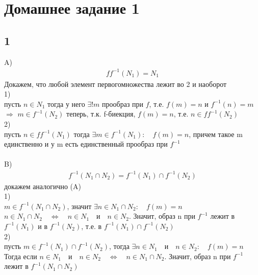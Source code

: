 \newpage
	\section{Домашнее задание 1}
		\subsection{1}
		A)\\
		\begin{gather*}
			ff^{-1}(N_1) = N_1
		\end{gather*}
		Докажем, что любой элемент первогомножества лежит во 2 и наоборот\\
		1)\\
		пусть $n \in N_1$ тогда у него $\exists !m$ прообраз при $f$, т.е. $f(m) = n$ и $f^{-1}(n) = m$ $\Longrightarrow$ $m \in f^{-1}(N_2)$ теперь, т.к. f-биекция, $f(m) = n$, т.е. $n \in ff^{-1}(N_2)$
		\\
		2)\\
		пусть $n \in ff^{-1}(N_1)$ тогда $\exists m\in f^{-1}(N_1): \quad f(m) = n$, причем такое m единственно и у m есть единственный прообраз при $f^{-1}$
		\\ \\
		B)\\
		\begin{gather*}
			f^{-1}(N_1 \cap N_2) = f^{-1}(N_1) \cap f^{-1}(N_2)
		\end{gather*}
		докажем аналогично (A)\\
		1)\\
		$m \in f^{-1}(N_1 \cap N_2)$, значит $\exists n \in N_1 \cap N_2: \quad f(m) = n$\\
		$n \in N_1 \cap N_2 \quad \Longleftrightarrow \quad n \in N_1 \quad \text{и} \quad n \in N_2$. Значит, образ n при $f^{-1}$ лежит в $f^{-1}(N_1)$ и в $f^{-1}(N_2)$, т.е. в $f^{-1}(N_1) \cap f^{-1}(N_2)$
		\\
		2)\\
		пусть $m \in f^{-1}(N_1) \cap f^{-1}(N_2)$, тогда $\exists n \in N_1 \quad \text{и} \quad n \in N_2: \quad f(m) = n$ Тогда если $n \in N_1 \quad \text{и} \quad n \in N_2 \quad \Longleftrightarrow \quad n \in N_1 \cap N_2$. Значит, образ n при $f^{-1}$ лежит в $f^{-1}(N_1 \cap N_2)$
		\\
		
